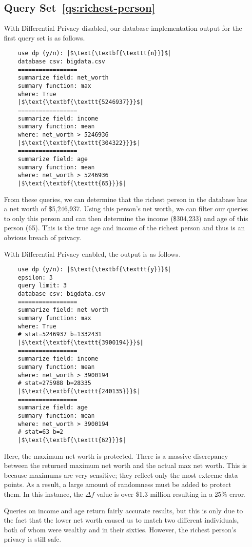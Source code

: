 \documentclass[conference,11pt]{IEEEtran}
\begin{document}
\subsection{Query Set~\ref{qs:richest-person}}
With Differential Privacy disabled, our database implementation output for the
first query set is as follows.
\begin{verbatim}
    use dp (y/n): |$\text{\textbf{\texttt{n}}}$|
    database csv: bigdata.csv
    =================
    summarize field: net_worth
    summary function: max
    where: True
    |$\text{\textbf{\texttt{5246937}}}$|
    =================
    summarize field: income
    summary function: mean
    where: net_worth > 5246936
    |$\text{\textbf{\texttt{304322}}}$|
    =================
    summarize field: age
    summary function: mean
    where: net_worth > 5246936
    |$\text{\textbf{\texttt{65}}}$|
\end{verbatim}
From these queries, we can determine that the richest person in the database has
a net worth of \$5,246,937. Using this person's net worth, we can filter our
queries to only this person and can then determine the income (\$304,233) and
age of this person (65). This is the true age and income of the richest person
and thus is an obvious breach of privacy.

With Differential Privacy enabled, the output is as follows.
\begin{verbatim}
    use dp (y/n): |$\text{\textbf{\texttt{y}}}$|
    epsilon: 3
    query limit: 3
    database csv: bigdata.csv
    =================
    summarize field: net_worth
    summary function: max
    where: True
    # stat=5246937 b=1332431
    |$\text{\textbf{\texttt{3900194}}}$|
    =================
    summarize field: income
    summary function: mean
    where: net_worth > 3900194
    # stat=275988 b=28335
    |$\text{\textbf{\texttt{240135}}}$|
    =================
    summarize field: age
    summary function: mean
    where: net_worth > 3900194
    # stat=63 b=2
    |$\text{\textbf{\texttt{62}}}$|
\end{verbatim}
Here, the maximum net worth is protected. There is a massive discrepancy between
the returned maximum net worth and the actual max net worth. This is because
maximums are very sensitive; they reflect only the most extreme data points. As
a result, a large amount of randomness must be added to protect them.  In this
instance, the $\Delta f$ value is over \$1.3 million resulting in a 25\% error.

Queries on income and age return fairly accurate results, but this is only due 
to the fact that the lower net worth caused us to match two different individuals, 
both of whom were wealthy and in their sixties. However, the richest person's 
privacy is still safe.
\end{document}
